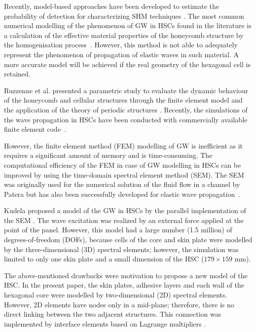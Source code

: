 \documentclass[sensors,article,accept,moreauthors,pdftex]{Definitions/mdpi}
\begin{document}
Recently, model-based approaches have been developed to estimate the probability of detection for characterizing  SHM techniques \cite{janapati2016damage, moriot2018model, tschoke2021feasibility, gao2022model}. 
The most common numerical modelling of the phenomenon of GW in  HSCs found in the literature is a calculation of the effective material properties of the honeycomb structure by the homogenisation process~\mbox{\cite{shi1995derivation, qi2008ultrasonic, mustapha2014leaky, baid2015dispersion, sikdar2016guided}}.
However, this method is not able to adequately represent the phenomenon of propagation of elastic waves in such material.
A more accurate model will be achieved if the real geometry of the hexagonal cell is retained.

Ruzzenne et al. presented a parametric study to evaluate the dynamic behaviour of the honeycomb and cellular structures through the finite element model and the application of the theory of periodic structures \cite{ruzzene2003wave}.
Recently, the simulations of the wave propagation in  HSCs have been conducted with  commercially available finite element code~\cite{song2009guided, hosseini2013numerical, tian2015wavenumber, zhao2018wave}.

However, the finite element method (FEM) modelling of GW is inefficient as it requires a significant amount of memory and is time-consuming.
The computational efficiency of the FEM in case of GW modelling in  HSCs can be improved by using the time-domain spectral element method (SEM).
The SEM was originally used for the numerical solution of the fluid flow in a channel by Patera \cite{patera1984spectral} but has also been successfully developed for elastic wave propagation~\cite{ostachowicz2011guided}.

Kudela proposed a model of the GW in  HSCs by the parallel implementation of the SEM \cite{kudela2016parallel}.
The wave excitation was realized by an external force applied at the point of the panel.
However, this model had a large number (1.5 million) of degrees-of-freedom (DOFs), because cells of the core and skin plate were modelled by the three-dimensional (3D) spectral elements; however, the simulation was limited to only one skin plate and a small dimension of the HSC (\(179 \times 159 \) mm).

The above-mentioned drawbacks were motivation to propose a new model of the HSC.
In the present paper, the skin plates, adhesive layers and each wall of the hexagonal core were modelled by two-dimensional (2D) spectral elements.
However, 2D elements have nodes only in a mid-plane; therefore, there is no direct linking between the two adjacent structures.
This connection was implemented by interface elements based on Lagrange multipliers \cite{ashwin2014formulation, fiborek20192d}.
\end{document}
